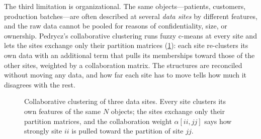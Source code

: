 The third limitation is organizational. The same objects---patients, customers, production batches---are often described at several \emph{data sites} by different features, and the raw data cannot be pooled for reasons of confidentiality, size, or ownership. Pedrycz's collaborative clustering \cite{pedrycz:2002:collaborative} runs fuzzy c-means at every site and lets the sites exchange only their partition matrices (\cref{fig:beyond:sites}): each site re-clusters its own data with an additional term that pulls its memberships toward those of the other sites, weighted by a collaboration matrix. The structures are reconciled without moving any data, and how far each site has to move tells how much it disagrees with the rest.

\begin{figure}[htbp]\centering
{}
\caption[Collaborative clustering of three data sites.]{Collaborative clustering of three data sites. Every site clusters its own features of the same $N$ objects; the sites exchange only their partition matrices, and the collaboration weight $\alpha[ii,jj]$ says how strongly site $ii$ is pulled toward the partition of site $jj$.}
\label{fig:beyond:sites}
\end{figure}


